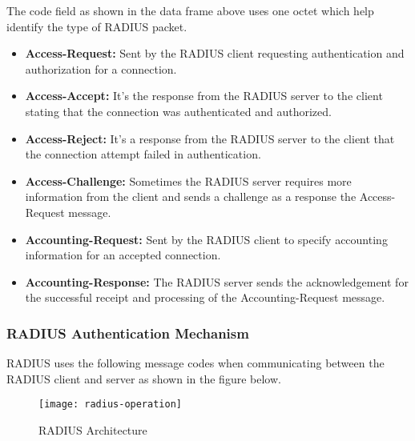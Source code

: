 The code field as shown in the data frame above uses one octet which help identify the type of RADIUS packet.
\begin{itemize}
	\item \textbf{Access-Request:} Sent by the RADIUS client requesting authentication and authorization for a connection.
	\item \textbf{Access-Accept:} It’s the response from the RADIUS server to the client stating that the connection was authenticated and authorized.
	\item \textbf{Access-Reject:} It’s a response from the RADIUS server to the client that the connection attempt failed in authentication.
	\item \textbf{Access-Challenge:} Sometimes the RADIUS server requires more information from the client and sends a challenge as a response the Access-Request message.
	\item \textbf{Accounting-Request:} Sent by the RADIUS client to specify accounting information for an accepted connection.
	\item \textbf{Accounting-Response:} The RADIUS server sends the acknowledgement for the successful receipt and processing of the Accounting-Request message.
	
\end{itemize}

\subsubsection{RADIUS Authentication Mechanism} \label{RADIUS_auth_mechanism}
RADIUS uses the following message codes when communicating between the RADIUS client and server as shown in the figure below.

\begin{figure}[H]
	\centering
	\texttt{[image: radius-operation]}
	\caption {RADIUS Architecture \cite{Radius_operation_img}}
	\label{fig:RADIUS_architecture}
	\vspace{-10pt}
\end{figure}

